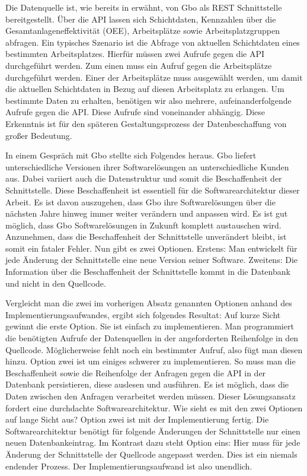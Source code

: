 Die Datenquelle ist, wie bereits in  erwähnt, von Gbo als REST Schnittstelle
bereitgestellt. Über die API lassen sich Schichtdaten, Kennzahlen über die Gesamtanlageneffektivität (OEE), Arbeitsplätze
sowie Arbeitsplatzgruppen abfragen. Ein typisches Szenario ist die Abfrage von aktuellen Schichtdaten eines bestimmten
Arbeitsplatzes. Hierfür müssen zwei Aufrufe gegen die API durchgeführt werden. Zum einen muss ein Aufruf gegen die
Arbeitsplätze durchgeführt werden. Einer der Arbeitsplätze muss ausgewählt werden, um damit die aktuellen Schichtdaten
in Bezug auf diesen Arbeitsplatz zu erlangen. Um bestimmte Daten zu erhalten, benötigen wir also mehrere, aufeinanderfolgende
Aufrufe gegen die API. Diese Aufrufe sind voneinander abhängig. Diese Erkenntnis ist für den späteren Gestaltungsprozess
der Datenbeschaffung von großer Bedeutung.

In einem Gespräch mit Gbo stellte sich Folgendes heraus. Gbo liefert unterschiedliche Versionen ihrer
Softwarelösungen an unterschiedliche Kunden aus. Dabei variiert auch die Datenstruktur und somit die Beschaffenheit der
Schnittstelle. Diese Beschaffenheit ist essentiell für die Softwarearchitektur dieser Arbeit. Es ist davon auszugehen,
dass Gbo ihre Softwarelösungen über die nächsten Jahre hinweg immer weiter verändern und anpassen wird.
Es ist gut möglich, dass Gbo Softwarelösungen in Zukunft komplett austauschen wird. Anzunehmen,
dass die Beschaffenheit der Schnittstelle unverändert bleibt, ist somit ein fataler Fehler. Nun gibt es zwei Optionen.
Erstens: Man entwickelt für jede Änderung der Schnittstelle eine neue Version seiner Software. Zweitens:
Die Information über die Beschaffenheit der Schnittstelle kommt in die Datenbank und nicht in den
Quellcode.

Vergleicht man die zwei im vorherigen Absatz genannten Optionen anhand des Implementierungsaufwandes,
ergibt sich folgendes Resultat: Auf kurze Sicht gewinnt die erste Option. Sie ist einfach zu implementieren.
Man programmiert die benötigten Aufrufe der Datenquellen in der angeforderten Reihenfolge in den Quellcode.
Möglicherweise fehlt noch ein bestimmter Aufruf, also fügt man diesen hinzu.
Option zwei ist um einiges schwerer zu implementieren. So muss man die Beschaffenheit sowie die Reihenfolge der Anfragen
gegen die API in der Datenbank persistieren, diese auslesen und ausführen. Es ist möglich, dass die Daten zwischen den
Anfragen verarbeitet werden müssen. Dieser Lösungsansatz fordert eine durchdachte Softwarearchitektur. Wie sieht es mit den
zwei Optionen auf lange Sicht aus? Option zwei ist mit der Implementierung fertig. Die Softwarearchitektur
benötigt für folgende Änderungen der Schnittstelle nur einen neuen Datenbankeintrag. Im Kontrast dazu steht Option eins:
Hier muss für jede Änderung der Schnittstelle der Quellcode angepasst werden. Dies ist ein niemals endender Prozess.
Der Implementierungsaufwand ist also unendlich.

